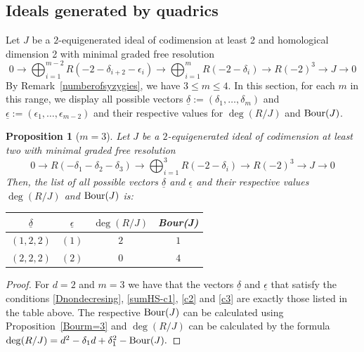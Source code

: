 \documentclass[11pt]{amsart} %
\newtheorem{Proposition}[Theorem]{Proposition}
\theoremstyle{definition}
\begin{document}
\subsection{Ideals generated by quadrics}\label{subsec:ideals-quadrics} Let $J$ be a $2$-equigenerated ideal of codimension at least 2 and homological dimension 2 with minimal graded free resolution  
\begin{equation}
	0\to \bigoplus_{i=1}^{m-2}R(-2-\delta_{i+2}-\epsilon_i)\to \bigoplus_{i=1}^m R(-2-\delta_i)\to R(-2)^3\to J\to 0
\end{equation} 
By Remark~\ref{numberofsyzygies}, we have $3\leq m\leq 4$. In this section, for each $m$ in this range, we display all possible vectors $\underline{\delta}:=(\delta_1,\ldots,\delta_m)$ and   $\underline{\epsilon}:=(\epsilon_1,\ldots,\epsilon_{m-2})$ and their respective values for $\deg(R/J)$ and ${\rm Bour}(J)$.



\begin{Proposition}[$m=3$]
	Let $J$ be a $2$-equigenerated ideal of codimension at least two with minimal graded free resolution
	\begin{equation}
		0\to R(-\delta_1-\delta_2-\delta_3)\to \bigoplus_{i=1}^3 R(-2-\delta_i)\to R(-2)^3\to J\to 0
	\end{equation}
	Then, the list of all possible vectors $\underline{\delta}$ and $\underline{\epsilon}$ and their respective values $\deg(R/J)$ and ${\rm Bour}(J)$ is:
	\begin{table}[H]
		\begin{center}
			\begin{tabular}{|c|c|c|c|}
				\hline
				$\underline{\delta}$&$\underline{\epsilon}$&$\deg(R/J)$&{\rm Bour}(J)\\
				\hline
				$(1,2,2)$&$(1)$&$2$&$1$\\
				$(2,2,2)$&$(2)$&$0$&$4$\\
				\hline
					\end{tabular}
			\end{center}
		\end{table}
				\end{Proposition}
			\begin{proof} For $d=2$ and $m=3$ we have that the vectors $\underline{\delta}$ and  $\underline{\epsilon}$ that  satisfy the conditions \eqref{Dnondecresing}, \eqref{sumHS-c1}, \eqref{c2} and \eqref{c3} are exactly those listed in the table above. The respective ${\rm Bour}(J)$ can be calculated using Proposition~\ref{Bourm=3} and $\deg(R/J)$ can be calculated by the formula $\deg(R/J)=d^2-\delta_1d+\delta_1^2-{\rm Bour}(J).$
					\end{proof}
\end{document}
